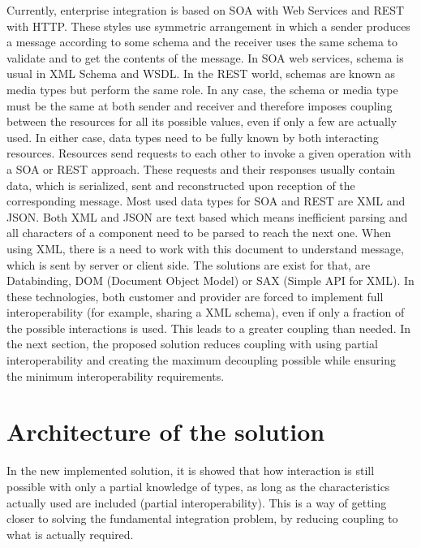 \documentclass[runningheads,a4paper]{llncs}
\begin{document}
Currently, enterprise integration is based on SOA with Web Services and REST with HTTP.  These styles use symmetric arrangement in which a sender produces a message according to some schema and the receiver uses the same schema to validate and to get the contents of the message. In SOA web services, schema is usual in XML Schema and WSDL. In the REST world, schemas are known as media types but perform the same role. In any case, the schema or media type must be the same at both sender and receiver and therefore imposes coupling between the resources for all its possible values, even if only a few are actually used. In either case, data types need to be fully known by both interacting resources. Resources send requests to each other to invoke a given operation with a SOA or REST approach. These requests and their responses usually contain data, which is serialized, sent and reconstructed upon reception of the corresponding message. Most used data types for SOA and REST are XML and JSON. Both XML and JSON are text based which means inefficient parsing and all characters of a component need to be parsed to reach the next one. When using XML, there is a need to work with this document to understand message, which is sent by server or client side. The solutions are exist for that, are Databinding, DOM (Document Object Model) or SAX (Simple API for XML)\cite{arch20}. In these technologies, both customer and provider are forced to implement full interoperability (for example, sharing a XML schema), even if only a fraction of the possible interactions is used. This leads to a greater coupling than needed. In the next section, the proposed solution reduces coupling with using partial interoperability and creating the maximum decoupling possible while ensuring the minimum interoperability requirements.
\section{Architecture of the solution}
In the new implemented solution, it is showed that how interaction is still possible with only a partial knowledge of types, as long as the characteristics actually used are included (partial interoperability). This is a way of getting closer to solving the fundamental integration problem, by reducing coupling to what is actually required.
\end{document}
